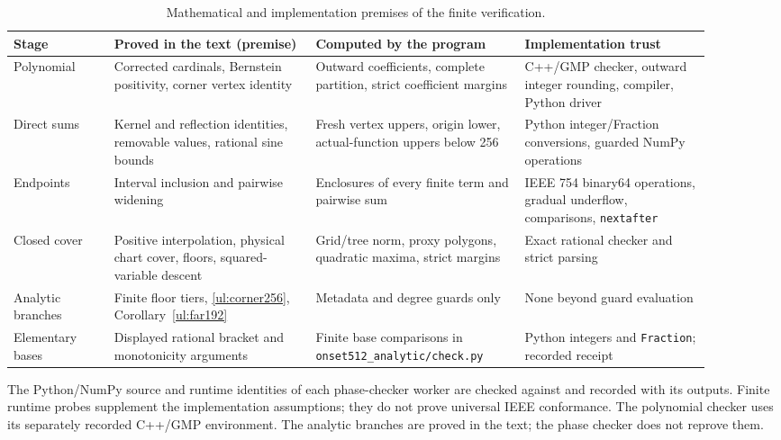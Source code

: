 \begin{table}[htbp]
\centering\small
\caption{Mathematical and implementation premises of the finite verification.}
\label{cert:trust}
\begin{tabular}{@{}>{\raggedright\arraybackslash}p{0.13\linewidth}
>{\raggedright\arraybackslash}p{0.26\linewidth}
>{\raggedright\arraybackslash}p{0.27\linewidth}
>{\raggedright\arraybackslash}p{0.24\linewidth}@{}}
\toprule
Stage & Proved in the text (premise) & Computed by the program & Implementation trust\\
\midrule
Polynomial & Corrected cardinals, Bernstein positivity, corner vertex identity &
Outward coefficients, complete partition, strict coefficient margins &
C++/GMP checker, outward integer rounding, compiler, Python driver\\
Direct sums & Kernel and reflection identities, removable values, rational sine bounds &
Fresh vertex uppers, origin lower, actual-function uppers below 256 &
Python integer/Fraction conversions, guarded NumPy operations\\
Endpoints & Interval inclusion and pairwise widening &
Enclosures of every finite term and pairwise sum &
IEEE 754 binary64 operations, gradual underflow, comparisons, \texttt{nextafter}\\
Closed cover & Positive interpolation, physical chart cover, floors, squared-variable descent &
Grid/tree norm, proxy polygons, quadratic maxima, strict margins &
Exact rational checker and strict parsing\\
Analytic branches & Finite floor tiers, \eqref{ul:corner256}, Corollary~\ref{ul:far192} &
Metadata and degree guards only & None beyond guard evaluation\\
Elementary bases & Displayed rational bracket and monotonicity arguments &
Finite base comparisons in \texttt{onset512\_analytic/}\newline\texttt{check.py} &
Python integers and \texttt{Fraction}; recorded receipt\\
\bottomrule
\end{tabular}
\par\smallskip\footnotesize
The Python/NumPy source and runtime identities of each phase-checker
worker are checked against
 and recorded
with its outputs. Finite runtime probes supplement the implementation
assumptions; they do not prove universal IEEE conformance.
The polynomial checker uses its separately recorded C++/GMP environment.
The analytic branches are proved in the text; the phase checker does not
reprove them.
\end{table}

